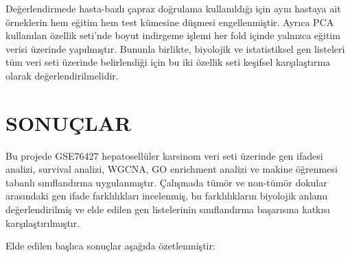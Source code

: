\documentclass[12pt,a4paper,oneside]{report}
\begin{document}
Değerlendirmede hasta-bazlı çapraz doğrulama kullanıldığı için aynı hastaya ait örneklerin hem eğitim hem test kümesine düşmesi engellenmiştir. Ayrıca PCA kullanılan özellik seti'nde boyut indirgeme işlemi her fold içinde yalnızca eğitim verisi üzerinde yapılmıştır. Bununla birlikte, biyolojik ve istatistiksel gen listeleri tüm veri seti üzerinde belirlendiği için bu iki özellik seti keşifsel karşılaştırma olarak değerlendirilmelidir.

\chapter{SONUÇLAR}

Bu projede GSE76427 hepatosellüler karsinom veri seti üzerinde gen ifadesi analizi, survival analizi, WGCNA, GO enrichment analizi ve makine öğrenmesi tabanlı sınıflandırma uygulanmıştır. Çalışmada tümör ve non-tümör dokular arasındaki gen ifade farklılıkları incelenmiş, bu farklılıkların biyolojik anlamı değerlendirilmiş ve elde edilen gen listelerinin sınıflandırma başarısına katkısı karşılaştırılmıştır.

Elde edilen başlıca sonuçlar aşağıda özetlenmiştir:
\end{document}
